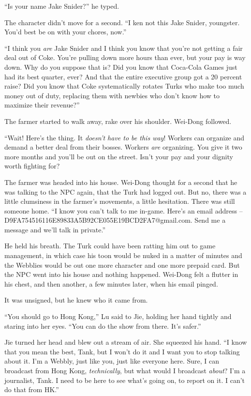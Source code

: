 ``Is your name Jake Snider?'' he typed.

The character didn't move for a second. ``I ken not this Jake
Snider, youngster. You'd best be on with your chores, now.''

``I think you \emph{are} Jake Snider and I think you know that
you're not getting a fair deal out of Coke. You're pulling down
more hours than ever, but your pay is way down. Why do you suppose
that is? Did you know that Coca-Cola Games just had its best
quarter, ever? And that the entire executive group got a 20 percent
raise? Did you know that Coke systematically rotates Turks who make
too much money out of duty, replacing them with newbies who don't
know how to maximize their revenue?''

The farmer started to walk away, rake over his shoulder. Wei-Dong
followed.

``Wait! Here's the thing. It \emph{doesn't have to be this way}!
Workers can organize and demand a better deal from their bosses.
Workers \emph{are} organizing. You give it two more months and
you'll be out on the street. Isn't your pay and your dignity worth
fighting for?

The farmer was headed into his house. Wei-Dong thought for a second
that he was talking to the NPC again, that the Turk had logged out.
But no, there was a little clumsiness in the farmer's movements, a
little hesitation. There was still someone home. ``I know you can't
talk to me in-game. Here's an email address --
D9FA754516116E89833A5B92CE055E19BCD2FA7@gmail.com. Send me a
message and we'll talk in private.''

He held his breath. The Turk could have been ratting him out to
game management, in which case his toon would be nuked in a matter
of minutes and the Webblies would be out one more character and one
more prepaid card. But the NPC went into his house and nothing
happened. Wei-Dong felt a flutter in his chest, and then another, a
few minutes later, when his email pinged.


It was unsigned, but he knew who it came from.

\tb

``You should go to Hong Kong,'' Lu said to Jie, holding her hand
tightly and staring into her eyes. ``You can do the show from there.
It's safer.''

Jie turned her head and blew out a stream of air. She squeezed his
hand. ``I know that you mean the best, Tank, but I won't do it and I
want you to stop talking about it. I'm a Webbly, just like you,
just like everyone here. Sure, I can broadcast from Hong Kong,
\emph{technically}, but what would I broadcast \emph{about}? I'm a
journalist, Tank. I need to be here to see what's going on, to
report on it. I can't do that from HK.''

